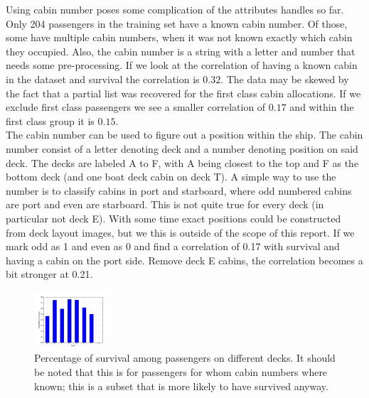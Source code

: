 \documentclass{llncs}
\begin{document}
Using cabin number poses some complication of the attributes handles so far. Only 204 passengers in the training set have a known cabin number. Of those, some have multiple cabin numbers, when it was not known exactly which cabin they occupied. Also, the cabin number is a string with a letter and number that needs some pre-processing. If we look at the correlation of having a known cabin in the dataset and survival the correlation is $0.32$.  The data may be skewed by the fact that a partial list was recovered for the first class cabin allocations\cite{cavelist}. If we exclude first class passengers we see a smaller correlation of $0.17$ and within the first class group it is $0.15$.\\
The cabin number can be used to figure out a position within the ship. The cabin number consist of a letter denoting deck and a number denoting position on said deck. The decks are labeled A to F, with A being closest to the top and F as the bottom deck (and one boat deck cabin on deck T). A simple way to use the number is to classify cabins in port and starboard, where odd numbered cabins are port and even are starboard.  This is not quite true for every deck (in particular not deck E). With some time exact positions could be constructed from deck layout images, but we this is outside of the scope of this report. If we mark odd as 1 and even as 0 and find a correlation of 0.17 with survival and having a cabin on the port side. Remove deck E cabins, the correlation becomes a bit stronger at 0.21.
\begin{figure}[H]
    \centering
    \includegraphics[width=\linewidth, height=80px]{survival_per_deck}
    \caption{Percentage of survival among passengers on different decks. It should be noted that this is for passengers for whom cabin numbers where known; this is a subset that is more likely to have survived anyway.}
    \label{fig:survival_per_deck}
\end{figure}
\end{document}

